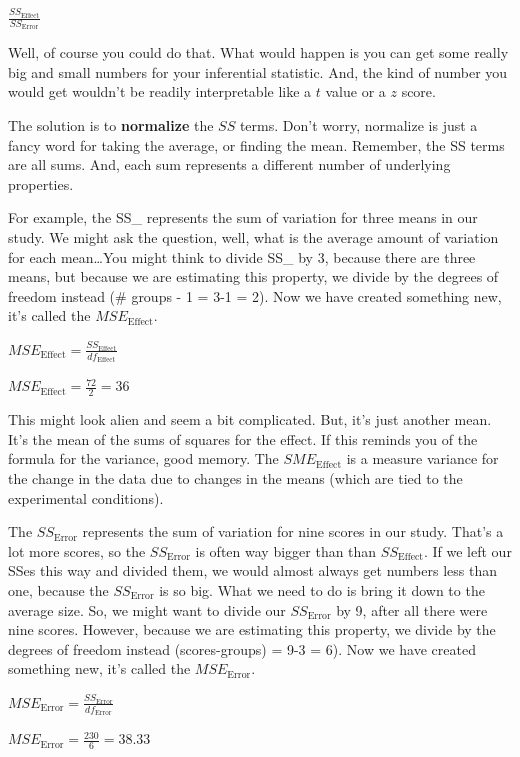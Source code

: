 \documentclass[
  letterpaper,
  DIV=11,
  numbers=noendperiod]{scrreprt}
\begin{document}
\(\frac{SS_\text{Effect}}{SS_\text{Error}}\)

Well, of course you could do that. What would happen is you can get some
really big and small numbers for your inferential statistic. And, the
kind of number you would get wouldn't be readily interpretable like a
\(t\) value or a \(z\) score.

The solution is to \textbf{normalize} the \(SS\) terms. Don't worry,
normalize is just a fancy word for taking the average, or finding the
mean. Remember, the SS terms are all sums. And, each sum represents a
different number of underlying properties.

For example, the SS\_ represents the sum of variation for
three means in our study. We might ask the question, well, what is the
average amount of variation for each mean\ldots You might think to
divide SS\_ by 3, because there are three means, but
because we are estimating this property, we divide by the degrees of
freedom instead (\# groups - 1 = 3-1 = 2). Now we have created something
new, it's called the \(MSE_\text{Effect}\).

\(MSE_\text{Effect} = \frac{SS_\text{Effect}}{df_\text{Effect}}\)

\(MSE_\text{Effect} = \frac{72}{2} = 36\)

This might look alien and seem a bit complicated. But, it's just another
mean. It's the mean of the sums of squares for the effect. If this
reminds you of the formula for the variance, good memory. The
\(SME_\text{Effect}\) is a measure variance for the change in the data
due to changes in the means (which are tied to the experimental
conditions).

The \(SS_\text{Error}\) represents the sum of variation for nine scores
in our study. That's a lot more scores, so the \(SS_\text{Error}\) is
often way bigger than than \(SS_\text{Effect}\). If we left our SSes
this way and divided them, we would almost always get numbers less than
one, because the \(SS_\text{Error}\) is so big. What we need to do is
bring it down to the average size. So, we might want to divide our
\(SS_\text{Error}\) by 9, after all there were nine scores. However,
because we are estimating this property, we divide by the degrees of
freedom instead (scores-groups) = 9-3 = 6). Now we have created
something new, it's called the \(MSE_\text{Error}\).

\(MSE_\text{Error} = \frac{SS_\text{Error}}{df_\text{Error}}\)

\(MSE_\text{Error} = \frac{230}{6} = 38.33\)
\end{document}
